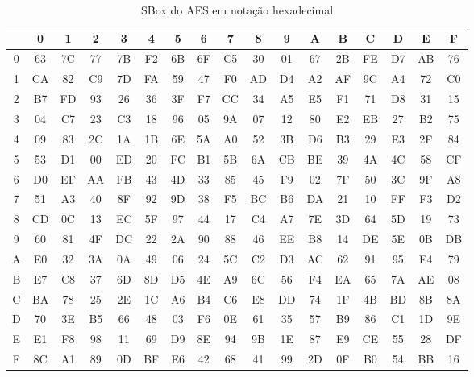 \begin{enumerate}
  \begin{table}[h!]
    \label{tab:sbox}
    \centering
    \scriptsize %
    \begin{tabular}{|c|*{16}{c|}}
      \hline
      & 0 & 1 & 2 & 3 & 4 & 5 & 6 & 7 & 8 & 9 & A & B & C & D & E & F \\
      \hline
      0 & 63 & 7C & 77 & 7B & F2 & 6B & 6F & C5 & 30 & 01 & 67 & 2B & FE & D7 & AB & 76 \\
      \hline
      1 & CA & 82 & C9 & 7D & FA & 59 & 47 & F0 & AD & D4 & A2 & AF & 9C & A4 & 72 & C0 \\
      \hline
      2 & B7 & FD & 93 & 26 & 36 & 3F & F7 & CC & 34 & A5 & E5 & F1 & 71 & D8 & 31 & 15 \\
      \hline
      3 & 04 & C7 & 23 & C3 & 18 & 96 & 05 & 9A & 07 & 12 & 80 & E2 & EB & 27 & B2 & 75 \\
      \hline
      4 & 09 & 83 & 2C & 1A & 1B & 6E & 5A & A0 & 52 & 3B & D6 & B3 & 29 & E3 & 2F & 84 \\
      \hline
      5 & 53 & D1 & 00 & ED & 20 & FC & B1 & 5B & 6A & CB & BE & 39 & 4A & 4C & 58 & CF \\
      \hline
      6 & D0 & EF & AA & FB & 43 & 4D & 33 & 85 & 45 & F9 & 02 & 7F & 50 & 3C & 9F & A8 \\
      \hline
      7 & 51 & A3 & 40 & 8F & 92 & 9D & 38 & F5 & BC & B6 & DA & 21 & 10 & FF & F3 & D2 \\
      \hline
      8 & CD & 0C & 13 & EC & 5F & 97 & 44 & 17 & C4 & A7 & 7E & 3D & 64 & 5D & 19 & 73 \\
      \hline
      9 & 60 & 81 & 4F & DC & 22 & 2A & 90 & 88 & 46 & EE & B8 & 14 & DE & 5E & 0B & DB \\
      \hline
      A & E0 & 32 & 3A & 0A & 49 & 06 & 24 & 5C & C2 & D3 & AC & 62 & 91 & 95 & E4 & 79 \\
      \hline
      B & E7 & C8 & 37 & 6D & 8D & D5 & 4E & A9 & 6C & 56 & F4 & EA & 65 & 7A & AE & 08 \\
      \hline
      C & BA & 78 & 25 & 2E & 1C & A6 & B4 & C6 & E8 & DD & 74 & 1F & 4B & BD & 8B & 8A \\
      \hline
      D & 70 & 3E & B5 & 66 & 48 & 03 & F6 & 0E & 61 & 35 & 57 & B9 & 86 & C1 & 1D & 9E \\
      \hline
      E & E1 & F8 & 98 & 11 & 69 & D9 & 8E & 94 & 9B & 1E & 87 & E9 & CE & 55 & 28 & DF \\
      \hline
      F & 8C & A1 & 89 & 0D & BF & E6 & 42 & 68 & 41 & 99 & 2D & 0F & B0 & 54 & BB & 16 \\
      \hline
    \end{tabular}
    \caption{SBox do AES em notação hexadecimal}
  \end{table}
  

\end{enumerate}
